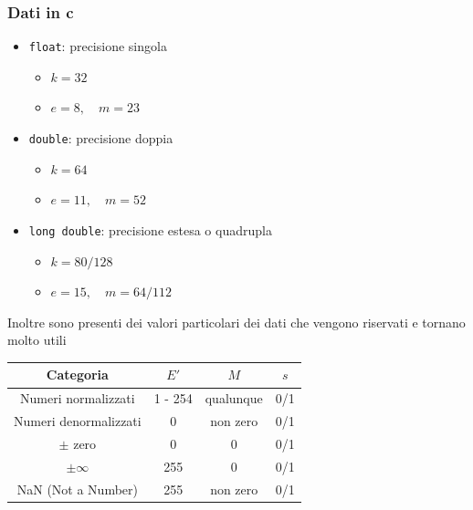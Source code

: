 \subsubsection*{Dati in c}
\begin{itemize}
	\item  \verb|float|: precisione singola
	      \begin{itemize}
		      \item  $ k = 32 $
		      \item $e = 8, \quad m = 23$
	      \end{itemize}
	\item \verb|double|: precisione doppia
	      \begin{itemize}
		      \item  $ k = 64 $
		      \item $e = 11, \quad m = 52$
	      \end{itemize}
	\item \verb|long double|: precisione estesa o quadrupla
	      \begin{itemize}
		      \item  $ k = 80 / 128 $
		      \item $e = 15, \quad m = 64 / 112$
	      \end{itemize}
\end{itemize}
Inoltre sono presenti dei valori particolari dei dati che vengono riservati e tornano molto utili
\begin{center}
	\begin{tabular}{| c c c c |}
		\hline
		Categoria             & $ E' $  & $ M $     & $ s $ \\
		\hline
		Numeri normalizzati   & 1 - 254 & qualunque & 0/1   \\
		Numeri denormalizzati & 0       & non zero  & 0/1   \\
		$ \pm $ zero          & 0       & 0         & 0/1   \\
		$ \pm \infty $        & 255     & 0         & 0/1   \\
		NaN (Not a Number)    & 255     & non zero  & 0/1   \\
		\hline
	\end{tabular}
\end{center}

